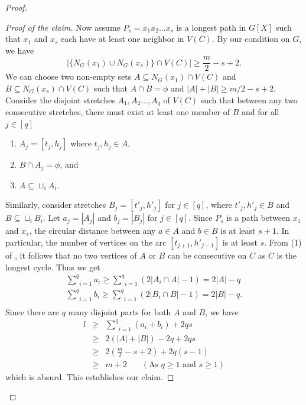 \documentclass[12pt]{article}
\theoremstyle{definition}
\begin{document}
\begin{proof}
\begin{proof}[Proof of the claim]
Now assume $P_s=x_1 x_2\ldots x_s$ is a longest path in ${G}[X]$ such that $x_1$ and $x_s$ each have at least one neighbor in $V(C)$. By our condition on $G$, we have
\begin{equation}
    |\{N_{G}(x_1) \cup N_{G}(x_s)\}\cap V(C)|\geq \frac{m}{2}-s+2.
\end{equation}
We can choose two non-empty sets $A\subseteq N_{G}(x_1) \cap V(C)$ and $B\subseteq N_{G}(x_s) \cap V(C)$ such that $A\cap B=\phi$ and $|A|+|B|\geq {m}/{2}-s+2$. 
 Consider the disjoint stretches $A_1, A_2 \dots, A_q$ of $V(C)$ such that between any two consecutive stretches, there must exist at least one member of $B$ and for all $j\in [q]$
\begin{enumerate}
    \item $A_j=[t_j,h_j]$ where $t_j,h_j\in A$,
    \item  $B\cap  A_j=\phi$, and
    \item $A\subseteq  \sqcup_{i}A_i$.
\end{enumerate}
 Similarly, consider stretches $B_j=[t'_j,h'_j]$ for $j\in [q]$, where $t'_j,h'_j\in B$ and $B\subseteq \sqcup_iB_i$. Let $a_j=|A_j|$ and $b_j=|B_j|$ for $j\in[q]$. Since $P_s$ is a path between $x_1$ and $x_s$, the circular distance between any $a\in A$ and $b\in B$ is at least $s+1$. In particular, the number of vertices on the arc $[t_{j+1},h'_{j-1}]$ is at least $s$. From (1) of , it follows that no two vertices of $A$ or $B$ can be consecutive on $C$ as $C$ is the longest cycle. Thus we get
\begin{align*}
    \underset{i=1}{\sum ^{q}} a_i\geq \underset{i=1}{\sum ^{q}} \left(2|A_i\cap A|-1\right)=2|A|-q\\
 \underset{i=1}{\sum ^{q}} b_i\geq \underset{i=1}{\sum ^{q}} \left(2|B_i\cap B|-1\right)=2|B|-q.\\
    \end{align*}
Since there are $q$ many disjoint parts for both $A$ and $B$, we have
\begin{eqnarray*}
    l &\geq&  \underset{i=1}{\sum ^{q}} (a_i+b_i)+ 2qs\\
    &\geq& 2(|A|+|B|)-2q+2qs\\
    &\geq& 2\left(\frac{m}{2}-s+2\right)+2q(s-1)\\
&\geq& m+2 \text{  }\;\;\;\; (\text{As }q\geq 1 \text{ and } s\geq 1)
\end{eqnarray*}
which is absurd. This establishes our claim.
\end{proof}



\end{proof}
\end{document}
